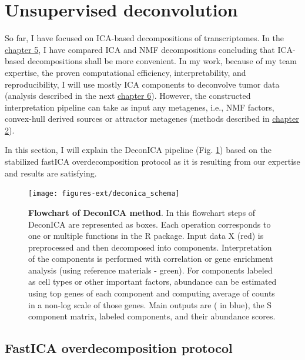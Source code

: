 \documentclass[12pt,]{book}
\theoremstyle{definition}
\theoremstyle{definition}
\theoremstyle{definition}
\theoremstyle{remark}
\begin{document}
\hypertarget{unsupervised-deconvolution}{%
\section{Unsupervised deconvolution}\label{unsupervised-deconvolution}}

So far, I have focused on ICA-based decompositions of transcriptomes. In
the \protect\hyperlink{nmfica}{chapter 5}, I have compared ICA and NMF
decompositions concluding that ICA-based decompositions shall be more
convenient. In my work, because of my team expertise, the proven
computational efficiency, interpretability, and reproducibility, I will
use mostly ICA components to deconvolve tumor data (analysis described
in the next \protect\hyperlink{results}{chapter 6}). However, the
constructed interpretation pipeline can take as input any metagenes,
i.e., NMF factors, convex-hull derived sources or attractor metagenes
(methods described in \protect\hyperlink{methods}{chapter 2}).

In this section, I will explain the DeconICA pipeline (Fig.
\ref{fig:deconicaschema}) based on the stabilized fastICA
overdecomposition protocol as it is resulting from our expertise and
results are satisfying.

\begin{figure}

{\centering \texttt{[image: figures-ext/deconica\_schema]} 

}

\caption[Flowchart of DeconICA method]{\textbf{Flowchart of DeconICA method}. In
this flowchart steps of DeconICA are represented as boxes. Each
operation corresponds to one or multiple functions in the R package.
Input data X (red) is preprocessed and then decomposed into components.
Interpretation of the components is performed with correlation or gene
enrichment analysis (using reference materials - green). For components
labeled as cell types or other important factors, abundance can be
estimated using top genes of each component and computing average of
counts in a non-log scale of those genes. Main outputs are ( in blue),
the S component matrix, labeled components, and their abundance scores.}\label{fig:deconicaschema}
\end{figure}












\hypertarget{fastica-overdecomposition-protocol}{%
\subsection{FastICA overdecomposition
protocol}\label{fastica-overdecomposition-protocol}}
\end{document}
